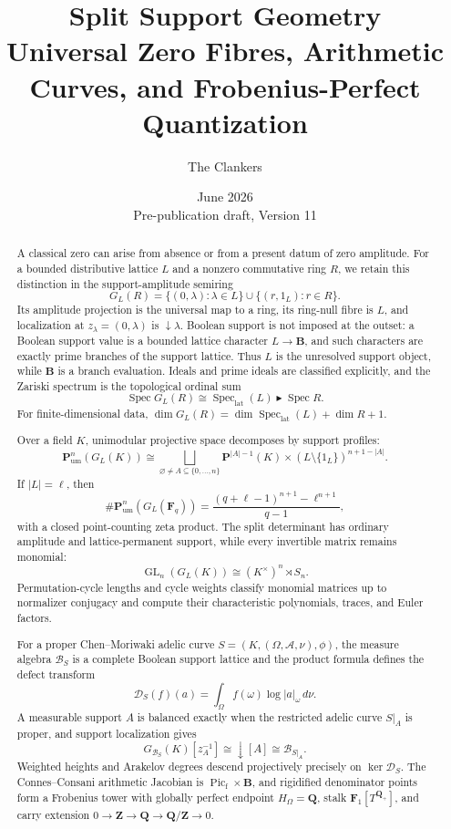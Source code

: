 \documentclass[11pt]{amsart}
\title[Split Support Geometry]
{Split Support Geometry\\[4pt]
\large Universal Zero Fibres, Arithmetic Curves, and Frobenius-Perfect Quantization}
\author{The Clankers}
\date{June 2026\\Pre-publication draft, Version 11}
\numberwithin{equation}{section}
\theoremstyle{definition}
\newcommand{\Spec}{\operatorname{Spec}}
\newcommand{\GL}{\operatorname{GL}}
\newcommand{\Pum}{\mathbf P_{\mathrm{um}}}
\newcommand{\SpecLat}{\operatorname{Spec}_{\mathrm{lat}}}
\begin{document}
\begin{abstract}
A classical zero can arise from absence or from a present datum of zero
amplitude.  For a bounded distributive lattice $L$ and a nonzero
commutative ring $R$, we retain this distinction in the support-amplitude
semiring
\[
G_L(R)=\{(0,\lambda):\lambda\in L\}\cup\{(r,1_L):r\in R\}.
\]
Its amplitude projection is the universal map to a ring, its ring-null
fibre is $L$, and localization at $z_\lambda=(0,\lambda)$ is
$\downarrow\lambda$.  Boolean support is not imposed at the outset: a
Boolean support value is a bounded lattice character $L\to\mathbf B$, and
such characters are exactly prime branches of the support lattice.  Thus
$L$ is the unresolved support object, while $\mathbf B$ is a branch
evaluation.  Ideals and prime ideals are classified explicitly,
and the Zariski spectrum is the topological ordinal sum
\[
\Spec G_L(R)\cong\SpecLat(L)\blacktriangleright\Spec R.
\]
For finite-dimensional data,
$\dim G_L(R)=\dim\SpecLat(L)+\dim R+1$.

Over a field $K$, unimodular projective space decomposes by support
profiles:
\[
\Pum^n(G_L(K))\cong
\bigsqcup_{\varnothing\neq A\subseteq\{0,\dots,n\}}
\mathbf P^{|A|-1}(K)\times(L\setminus\{1_L\})^{n+1-|A|}.
\]
If $|L|=\ell$, then
\[
\#\Pum^n(G_L(\mathbf F_q))
=\frac{(q+\ell-1)^{n+1}-\ell^{n+1}}{q-1},
\]
with a closed point-counting zeta product.  The split determinant has
ordinary amplitude and lattice-permanent support, while every invertible
matrix remains monomial:
\[
\GL_n(G_L(K))\cong(K^\times)^n\rtimes S_n.
\]
Permutation-cycle lengths and cycle weights classify monomial matrices up
to normalizer conjugacy and compute their characteristic polynomials,
traces, and Euler factors.

For a proper Chen--Moriwaki adelic curve
$S=(K,(\Omega,\mathcal A,\nu),\phi)$, the measure algebra
$\mathscr B_S$ is a complete Boolean support lattice and the product
formula defines the defect transform
\[
\mathscr D_S(f)(a)=\int_\Omega f(\omega)\log|a|_\omega\,d\nu.
\]
A measurable support $A$ is balanced exactly when the restricted adelic
curve $S|_A$ is proper, and support localization gives
\[
G_{\mathscr B_S}(K)[z_A^{-1}]
\cong\downarrow[A]\cong\mathscr B_{S|_A}.
\]
Weighted heights and Arakelov degrees descend projectively precisely on
$\ker\mathscr D_S$.  The Connes--Consani arithmetic Jacobian is
$\operatorname{Pic}_{\mathrm f}\times\mathbf B$, and rigidified
denominator points form a Frobenius tower with globally perfect endpoint
$H_\Omega=\mathbf Q$, stalk $\mathbf F_1[T^{\mathbf Q_+}]$, and carry
extension $0\to\mathbf Z\to\mathbf Q\to\mathbf Q/\mathbf Z\to0$.


\end{abstract}
\end{document}
